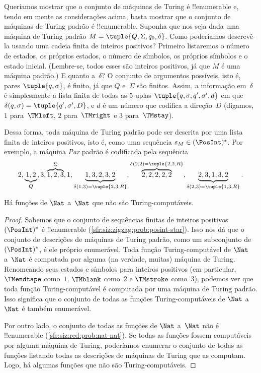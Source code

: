 \documentclass[../../../include/open-logic-section]{subfiles}
\begin{document}
\begin{explain}
Queríamos mostrar que o conjunto de máquinas de Turing é
!!{enumerable} e, tendo em mente as considerações acima, basta mostrar
que o conjunto de máquinas de Turing padrão é !!{enumerable}. Suponha
que nos seja dada uma máquina de Turing padrão $M = \tuple{Q, \Sigma,
q_0, \delta}$. Como poderíamos descrevê-la usando uma cadeia finita de
inteiros positivos? Primeiro listaremos o número de estados, os
próprios estados, o número de símbolos, os próprios símbolos e o
estado inicial. (Lembre-se, todos esses são inteiros positivos, já que
$M$ é uma máquina padrão.) E quanto a~$\delta$? O conjunto de
argumentos possíveis, isto é, pares $\tuple{q,\sigma}$, é finito, já
que $Q$ e~$\Sigma$ são finitos. Assim, a informação em~$\delta$ é
simplesmente a lista finita de todas as $5$-uplas $\tuple{q, \sigma,
q', \sigma', d}$ em que $\delta(q,\sigma) = \tuple{q', \sigma', D}$, e
$d$ é um número que codifica a direção~$D$ (digamos, $1$ para~$\TMleft$,
$2$ para~$\TMright$ e $3$ para~$\TMstay$).

Dessa forma, toda máquina de Turing padrão pode ser descrita por uma
lista finita de inteiros positivos, isto é, como uma sequência $s_M \in
(\PosInt)^*$. Por exemplo, a máquina \emph{Par} padrão é codificada
pela sequência
\[
2, \underbrace{1, 2}_Q, 3, \overbrace{1, 2, 3}^\Sigma, 1, \underbrace{1, 3, 2, 3, 2}_{\delta(1,3) = \tuple{2,3,R}}, 
\overbrace{2, 2, 2, 2, 2}^{\delta(2,2) = \tuple{2,2,R}},
\underbrace{2, 3, 1, 3, 2}_{\delta(2,3) = \tuple{1,3,R}}.
\]
\end{explain}

\begin{thm}
Há funções de $\Nat$ a~$\Nat$ que não são Turing-computáveis.
\end{thm}

\begin{proof}
Sabemos que o conjunto de sequências finitas de inteiros
positivos~$(\PosInt)^*$ é !!{enumerable}
(\cref{sfr:siz:zigzag:prob:posint-star}). Isso nos dá que o conjunto
de descrições de máquinas de Turing padrão, como um subconjunto
de~$(\PosInt)^*$, é ele próprio enumerável. Toda função
Turing-computável de $\Nat$ a~$\Nat$ é computada por alguma (na
verdade, muitas) máquina de Turing. Renomeando seus estados e símbolos
para inteiros positivos (em particular, $\TMendtape$ como~$1$,
$\TMblank$ como~$2$ e $\TMstroke$ como~$3$), podemos ver que toda
função Turing-computável é computada por uma máquina de Turing padrão.
Isso significa que o conjunto de todas as funções Turing-computáveis de
$\Nat$ a~$\Nat$ é também enumerável.

Por outro lado, o conjunto de todas as funções de $\Nat$ a~$\Nat$ não
é !!{enumerable} (\cref{sfr:siz:red:prob:nat-nat}). Se todas as funções
fossem computáveis por alguma máquina de Turing, poderíamos enumerar o
conjunto de todas as funções listando todas as descrições de máquinas
de Turing que as computam. Logo, há algumas funções que não são
Turing-computáveis. 
\end{proof}
\end{document}
